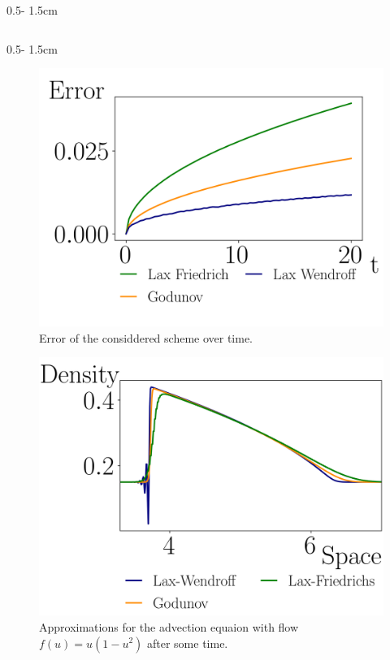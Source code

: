 \documentclass{uibposter}
\begin{document}
\begin{frame}[fragile]
\begin{columns}
\begin{column}{0.5\textwidth - 1.5cm}
\begin{column}{0.5\textwidth - 1.5cm}
    \begin{figure}
    	\includegraphics{fig/error_over_time.png}
    	\caption{Error of the considdered scheme over time.}
    	\label{img:error_over_time}
    \end{figure}
   
	\begin{figure}
	    \includegraphics{fig/traffic_compare.png}
	    \caption{Approximations for the advection equaion with flow $f(u) = u (1 - u^2)$ after some time.}
	    \label{img:traffic_comprehension}
	\end{figure}
    

\end{column}
\end{column}
\end{columns}
\end{frame}
\end{document}
